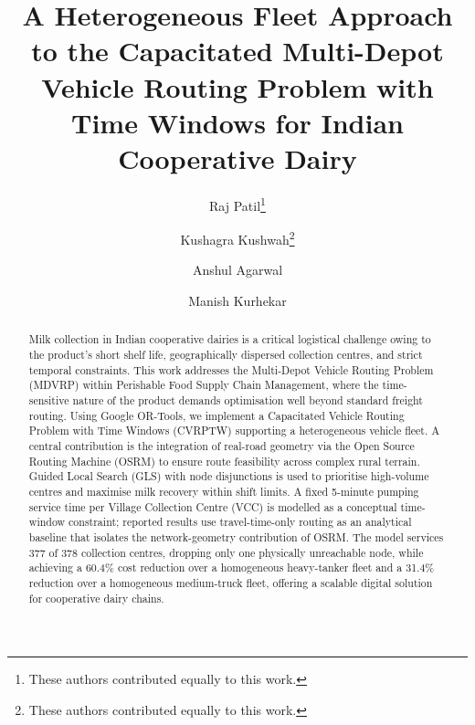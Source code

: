\documentclass{svproc}
\begin{document}
\mainmatter

\title{A Heterogeneous Fleet Approach to the Capacitated Multi-Depot Vehicle Routing Problem with Time Windows for Indian Cooperative Dairy}


\author{Raj Patil\thanks{These authors contributed equally to this work.} \and Kushagra Kushwah\thanks{These authors contributed equally to this work.} \and Anshul Agarwal \and Manish Kurhekar}




\maketitle

\begin{abstract}
Milk collection in Indian cooperative dairies is a critical logistical challenge owing to the product's short shelf life, geographically dispersed collection centres, and strict temporal constraints. This work addresses the Multi-Depot Vehicle Routing Problem (MDVRP) within Perishable Food Supply Chain Management, where the time-sensitive nature of the product demands optimisation well beyond standard freight routing. Using Google OR-Tools, we implement a Capacitated Vehicle Routing Problem with Time Windows (CVRPTW) supporting a heterogeneous vehicle fleet. A central contribution is the integration of real-road geometry via the Open Source Routing Machine (OSRM) to ensure route feasibility across complex rural terrain. Guided Local Search (GLS) with node disjunctions is used to prioritise high-volume centres and maximise milk recovery within shift limits. A fixed 5-minute pumping service time per Village Collection Centre (VCC) is modelled as a conceptual time-window constraint; reported results use travel-time-only routing as an analytical baseline that isolates the network-geometry contribution of OSRM. The model services 377 of 378 collection centres, dropping only one physically unreachable node, while achieving a 60.4\% cost reduction over a homogeneous heavy-tanker fleet and a 31.4\% reduction over a homogeneous medium-truck fleet, offering a scalable digital solution for cooperative dairy chains.
\end{abstract}
\end{document}
